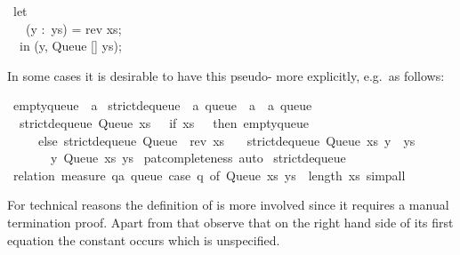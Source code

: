 \begin{isabellebody}
\begin{isamarkuptext}
\hspace*{0pt} ~let {}\\
\hspace*{0pt} ~~~(y :~ys) = rev xs;\\
\hspace*{0pt} ~{}~in (y, Queue [] ys);%
\end{isamarkuptext}%
\isamarkuptrue%
%
\endisatagquote
{\isafoldquote}%
%
\isadelimquote
%
\endisadelimquote
%
\begin{isamarkuptext}%
\noindent In some cases it is desirable to have this
  pseudo- more explicitly, e.g.~as follows:%
\end{isamarkuptext}%
\isamarkuptrue%
%
\isadelimquote
%
\endisadelimquote
%
\isatagquote
{}\isamarkupfalse%
\ empty{\isacharunderscore}queue\ {\isacharcolon}{\isacharcolon}\ {\isacharprime}a\isanewline
\isanewline
{}\isamarkupfalse%
\ strict{\isacharunderscore}dequeue{\isacharprime}\ {\isacharcolon}{\isacharcolon}\ {\isachardoublequoteopen}{\isacharprime}a\ queue\ {\isasymRightarrow}\ {\isacharprime}a\ {\isasymtimes}\ {\isacharprime}a\ queue{\isachardoublequoteclose}\ \isanewline
\ \ {\isachardoublequoteopen}strict{\isacharunderscore}dequeue{\isacharprime}\ {\isacharparenleft}Queue\ xs\ {\isacharbrackleft}{\isacharbrackright}{\isacharparenright}\ {\isacharequal}\ {\isacharparenleft}if\ xs\ {\isacharequal}\ {\isacharbrackleft}{\isacharbrackright}\ then\ empty{\isacharunderscore}queue\isanewline
\ \ \ \ \ else\ strict{\isacharunderscore}dequeue{\isacharprime}\ {\isacharparenleft}Queue\ {\isacharbrackleft}{\isacharbrackright}\ {\isacharparenleft}rev\ xs{\isacharparenright}{\isacharparenright}{\isacharparenright}{\isachardoublequoteclose}\isanewline
\ \ {\isacharbar}\ {\isachardoublequoteopen}strict{\isacharunderscore}dequeue{\isacharprime}\ {\isacharparenleft}Queue\ xs\ {\isacharparenleft}y\ {\isacharhash}\ ys{\isacharparenright}{\isacharparenright}\ {\isacharequal}\isanewline
\ \ \ \ \ \ \ {\isacharparenleft}y{\isacharcomma}\ Queue\ xs\ ys{\isacharparenright}{\isachardoublequoteclose}\isanewline
{}\isamarkupfalse%
\ pat{\isacharunderscore}completeness\ auto\isanewline
\isanewline
{}\isamarkupfalse%
\ strict{\isacharunderscore}dequeue{\isacharprime}\isanewline
{}\isamarkupfalse%
\ {\isacharparenleft}relation\ {\isachardoublequoteopen}measure\ {\isacharparenleft}{\isasymlambda}q{\isacharcolon}{\isacharcolon}{\isacharprime}a\ queue{\isachardot}\ case\ q\ of\ Queue\ xs\ ys\ {\isasymRightarrow}\ length\ xs{\isacharparenright}{\isachardoublequoteclose}{\isacharparenright}\ simp{\isacharunderscore}all%
\endisatagquote
{\isafoldquote}%
%
\isadelimquote
%
\endisadelimquote
%
\begin{isamarkuptext}%
\noindent For technical reasons the definition of
   is more involved since it requires
  a manual termination proof.  Apart from that observe that
  on the right hand side of its first equation the constant
   occurs which is unspecified.


\end{isamarkuptext}
\end{isabellebody}
